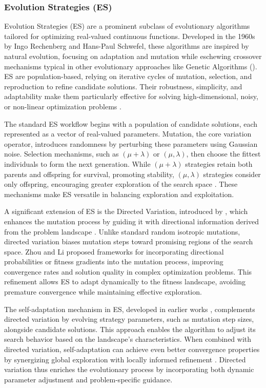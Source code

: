 \subsubsection{Evolution Strategies (ES)}
Evolution Strategies (ES) are a prominent subclass of evolutionary algorithms tailored for optimizing real-valued continuous functions. Developed in the 1960s by Ingo Rechenberg and Hans-Paul Schwefel, these algorithms are inspired by natural evolution, focusing on adaptation and mutation while eschewing crossover mechanisms typical in other evolutionary approaches like Genetic Algorithms (\cite{vent1975rechenberg,schwefel1977numerische}). ES are population-based, relying on iterative cycles of mutation, selection, and reproduction to refine candidate solutions. Their robustness, simplicity, and adaptability make them particularly effective for solving high-dimensional, noisy, or non-linear optimization problems \parencite{beyer2002evolution}.

The standard ES workflow begins with a population of candidate solutions, each represented as a vector of real-valued parameters. Mutation, the core variation operator, introduces randomness by perturbing these parameters using Gaussian noise. Selection mechanisms, such as \((\mu+\lambda)\) or \((\mu,\lambda)\), then choose the fittest individuals to form the next generation. While $(\mu+\lambda)$ strategies retain both parents and offspring for survival, promoting stability, \((\mu,\lambda)\) strategies consider only offspring, encouraging greater exploration of the search space \parencite{schwefel1993evolution}. These mechanisms make ES versatile in balancing exploration and exploitation.

A significant extension of ES is the Directed Variation, introduced by \textcite{zhou2003directed}, which enhances the mutation process by guiding it with directional information derived from the problem landscape \parencite{zhou2003directed}. Unlike standard random isotropic mutations, directed variation biases mutation steps toward promising regions of the search space. Zhou and Li proposed frameworks for incorporating directional probabilities or fitness gradients into the mutation process, improving convergence rates and solution quality in complex optimization problems. This refinement allows ES to adapt dynamically to the fitness landscape, avoiding premature convergence while maintaining effective exploration.

The self-adaptation mechanism in ES, developed in earlier works \parencite{schwefel1981numerical}, complements directed variation by evolving strategy parameters, such as mutation step sizes, alongside candidate solutions. This approach enables the algorithm to adjust its search behavior based on the landscape's characteristics. When combined with directed variation, self-adaptation can achieve even better convergence properties by synergizing global exploration with locally informed refinement \parencite{beyer2001theory}. Directed variation thus enriches the evolutionary process by incorporating both dynamic parameter adjustment and problem-specific guidance.

